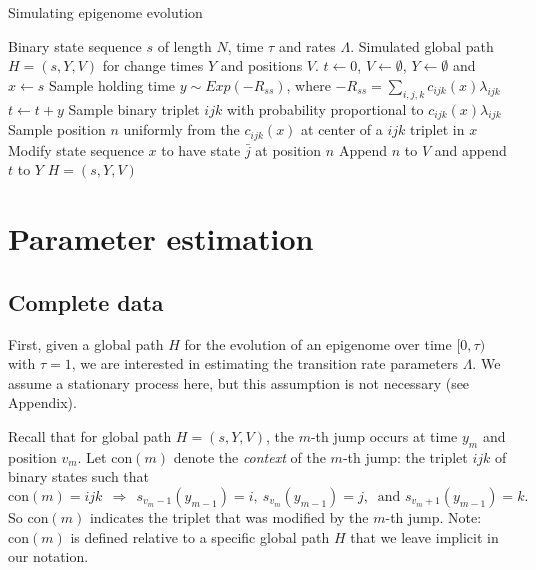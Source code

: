 \documentclass[11pt]{article}
\newcommand{\context}[1]{\ensuremath{\mathrm{con}(#1)}}
\newcommand\halfopen[2]{\ensuremath{[#1,#2)}}
\begin{document}
\begin{algorithm}[t]
  \begin{algorithmic}[1]
    \caption{Simulating epigenome evolution}\label{alg:simulation}
    \REQUIRE Binary state sequence $s$ of length $N$, time $\tau$ and rates $\Lambda$.
    \ENSURE Simulated global path $H = (s, Y, V)$ for change times $Y$ and positions $V$.
    \STATE $t \gets 0$, $V\gets\emptyset$, $Y\gets\emptyset$ and $x \gets s$
    \STATE Sample holding time $y\sim \mathit{Exp}(-R_{ss})$, where $-R_{ss} = \sum_{i,j,k}c_{ijk}(x)\lambda_{ijk}$
    \STATE $t \gets t + y$
    \STATE Sample binary triplet $ijk$ with probability proportional to $c_{ijk}(x)\lambda_{ijk}$
    \STATE Sample position $n$ uniformly from the $c_{ijk}(x)$ at center of a $ijk$ triplet in $x$
    \STATE Modify state sequence $x$ to have state $\bar{j}$ at position $n$
    \STATE Append $n$ to $V$ and append $t$ to $Y$
    \ENDIF
    \ENDWHILE
    \RETURN $H = (s, Y, V)$
  \end{algorithmic}
\end{algorithm}



\section{Parameter estimation}

\subsection{Complete data}

First, given a global path $H$ for the evolution of an epigenome over
time $\halfopen{0}{\tau}$ with $\tau = 1$, we are interested in
estimating the transition rate parameters $\Lambda$. We assume a
stationary process here, but this assumption is not necessary (see
Appendix).

Recall that for global path $H = (s, Y, V)$, the $m$-th jump occurs at
time $y_m$ and position $v_m$. Let $\context{m}$ denote the
\textit{context} of the $m$-th jump: the triplet $ijk$ of binary
states such that
\[
\context{m} = ijk ~~ \Rightarrow ~~ s_{v_m-1}(y_{m-1}) = i, ~ s_{v_m}(y_{m-1}) = j, ~ \mbox{ and } s_{v_m+1}(y_{m-1}) = k.
\]
So $\context{m}$ indicates the triplet that was modified by the $m$-th
jump. Note: $\context{m}$ is defined relative to a specific global
path $H$ that we leave implicit in our notation.
\end{document}
